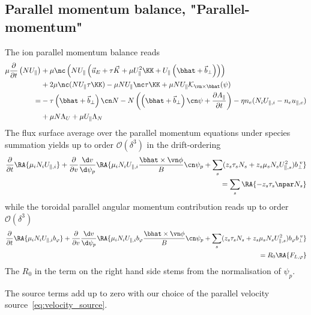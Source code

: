 \subsection{Parallel momentum balance, "Parallel-momentum"}
The ion parallel momentum balance reads
\begin{align}
    \mu \frac{\partial}{\partial t} \left(N U_\parallel\right) &+ \mu \nc \left( NU_\parallel \left(
    \vec u_E + \tau \vec K + \mu U_\parallel^2 \KK + U_\parallel\left(\bhat + {\vec b}_\perp\right)
    \right)\right)  \nonumber \\
    &+ 2\mu \nc ( NU_\parallel \tau \KK)
    -\mu NU_\parallel\nc \tau \KK
    + \mu NU_\parallel\mathcal K_{\vn\times\bhat}(\psi) \nonumber\\
    =& -\tau \left(\bhat + {\vec b}_\perp\right)\cn N
    -N \left( \left(\bhat+{\vec b}_\perp\right)\cn \psi + \frac{\partial A_\parallel}{\partial t}\right)
    - \eta n_e(N_iU_{\parallel,i}-n_eu_{\parallel,e})
    \nonumber\\
    &+ \mu N\Lambda_U + \mu U_\parallel \Lambda_N
\end{align}
The flux surface average over the parallel momentum equations under species summation  yields up to order $\mathcal O(\delta^3)$ in the drift-ordering
\begin{align}
  \frac{\partial}{\partial t}\RA{\mu_iN_iU_{\parallel,i} }
    + \frac{\partial}{\partial v} \frac{\d v}{\d\psi_p} \RA{\mu_iN_iU_{\parallel,i} \frac{\bhat\times\vn\phi}{B}\cn\psi_p + \sum_s (z_s\tau_sN_s + z_s\mu_s N_sU_{\parallel,s}^2) b_{\perp}^{\;v}  }
    \nonumber\\
   = \sum_s\RA{-z_s\tau_s \npar N_s}
   \label{eq:parallel_momentum}
\end{align}
while the toroidal parallel angular momentum contribution reads up to order $\mathcal O(\delta^3)$
\begin{align}\label{eq:parallel_momentum_direction}
    \frac{\partial}{\partial t}  \RA{\mu_iN_iU_{\parallel,i} b_\varphi}
    + \frac{\partial}{\partial v} \frac{\d v}{\d\psi_p} \RA{\mu_iN_iU_{\parallel,i} b_\varphi\frac{\bhat\times\vn\phi}{B}\cn\psi_p + \sum_s (z_s\tau_s N_s + z_s\mu_sN_sU_{\parallel,s}^2) b_\varphi b_{\perp}^{\;v} }
    \nonumber\\
    = R_0 \RA{F_{L,\varphi}}
\end{align}
The $R_0$ in the term on the right hand side stems from the normalisation of $\psi_p$.
\begin{tcolorbox}[title=Note]
The source terms add up to zero with our choice of the parallel velocity source~\eqref{eq:velocity_source}.
\end{tcolorbox}
